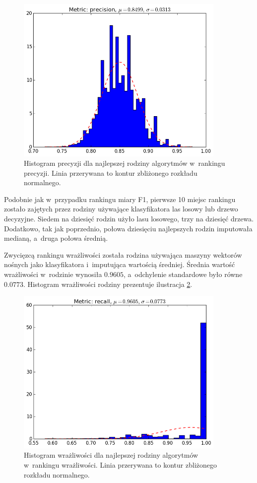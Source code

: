 \documentclass[../thesis.tex]{subfiles}
\begin{document}
\begin{figure}[h]
\centering
\includegraphics[width=0.9\textwidth]{13-precision.png}
\caption{Histogram precyzji dla najlepszej rodziny algorytmów w~rankingu precyzji. Linia przerywana to kontur zbliżonego rozkładu normalnego.}
\label{results:histogram_p_best}
\end{figure}

Podobnie jak w~przypadku rankingu miary F1, pierwsze 10 miejsc rankingu zostało zajętych przez rodziny używające klasyfikatora las losowy lub drzewo decyzyjne. Siedem na dziesięć rodzin użyło lasu losowego, trzy na dziesięć drzewa. Dodatkowo, tak jak poprzednio, połowa dziesięciu najlepszych rodzin imputowała medianą, a~druga połowa średnią.

Zwycięzcą rankingu wrażliwości została rodzina używająca maszyny wektorów nośnych jako klasyfikatora i~imputująca wartością średniej. Średnia wartość wrażliwości w~rodzinie wynosiła $0.9605$, a~odchylenie standardowe było równe $0.0773$. Histogram wrażliwości rodziny prezentuje ilustracja \ref{results:histogram_r_best}. 

\begin{figure}[h]
\centering
\includegraphics[width=0.9\textwidth]{68-recall.png}
\caption{Histogram wrażliwości dla najlepszej rodziny algorytmów w~rankingu wrażliwości. Linia przerywana to kontur zbliżonego rozkładu normalnego.}
\label{results:histogram_r_best}
\end{figure}
\end{document}
